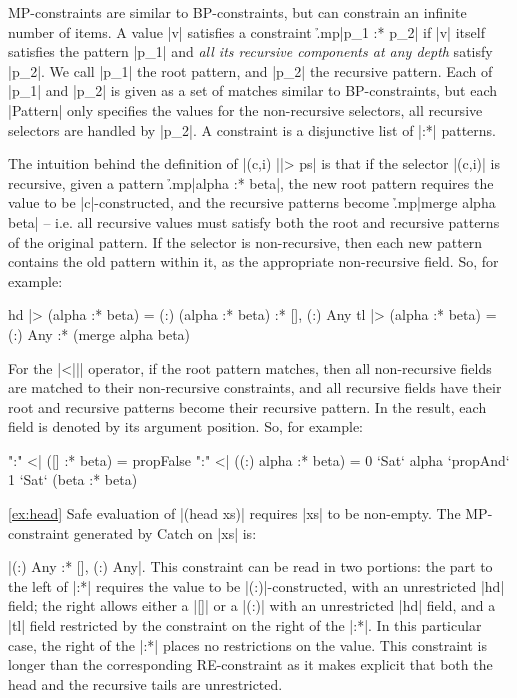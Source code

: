 \documentclass[preprint]{sigplanconf}
\begin{document}
MP-constraints are similar to BP-constraints, but can constrain an infinite number of items. A value |v| satisfies a constraint \h{.mp}|p_1 :* p_2| if |v| itself satisfies the pattern |p_1| and \textit{all its recursive components at any depth} satisfy |p_2|. We call |p_1| the root pattern, and |p_2| the recursive pattern. Each of |p_1| and |p_2| is given as a set of matches similar to BP-constraints, but each |Pattern| only specifies the values for the non-recursive selectors, all recursive selectors are handled by |p_2|. A constraint is a disjunctive list of |:*| patterns.

The intuition behind the definition of |(c,i) ||> ps| is that if the selector |(c,i)| is recursive, given a pattern \h{.mp}|alpha :* beta|, the new root pattern requires the value to be |c|-constructed, and the recursive patterns become \h{.mp}|merge alpha beta| -- i.e. all recursive values must satisfy both the root and recursive patterns of the original pattern. If the selector is non-recursive, then each new pattern contains the old pattern within it, as the appropriate non-recursive field. So, for example:

\ignore\begin{code}
hd  |> (alpha :* beta) = {(:) (alpha :* beta)  } :* {[], (:) Any}
tl  |> (alpha :* beta) = {(:) Any              } :* (merge alpha beta)
\end{code}

For the |<||| operator, if the root pattern matches, then all non-recursive fields are matched to their non-recursive constraints, and all recursive fields have their root and recursive patterns become their recursive pattern. In the result, each field is denoted by its argument position. So, for example:

\ignore\begin{code}
":" <| ({[]         } :* beta) = propFalse
":" <| ({(:) alpha  } :* beta) = 0 `Sat` alpha `propAnd` 1 `Sat` (beta :* beta)
\end{code}

\begin{examplerevisit}{\ref{ex:head}} Safe evaluation of |(head xs)| requires |xs| to be non-empty. The MP-constraint generated by Catch on |xs| is: \ignore|{(:) Any} :* {[], (:) Any}|. This constraint can be read in two portions: the part to the left of |:*| requires the value to be |(:)|-constructed, with an unrestricted |hd| field; the right allows either a |[]| or a |(:)| with an unrestricted |hd| field, and a |tl| field restricted by the constraint on the right of the |:*|. In this particular case, the right of the |:*| places no restrictions on the value. This constraint is longer than the corresponding RE-constraint as it makes explicit that both the head and the recursive tails are unrestricted.
\end{examplerevisit}
\end{document}
